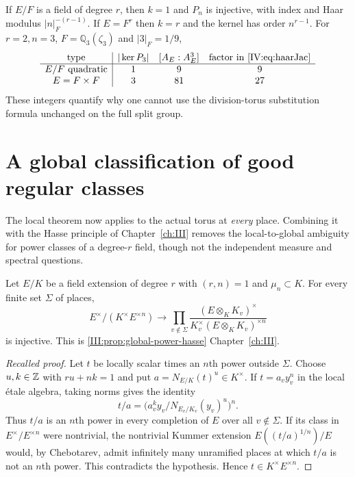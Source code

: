 \begin{example}
If $E/F$ is a field of degree $r$, then $k=1$ and $P_n$ is
injective, with index and Haar modulus $|n|_F^{-(r-1)}$.
If $E=F^r$ then $k=r$ and the kernel has order $n^{r-1}$.
For $r=2,n=3$, $F=\mathbb Q_3(\zeta_3)$ and $|3|_F=1/9$,
\[
\begin{array}{c|ccc}
\text{type}&|\ker P_3|&[A_E:A_E^3]&\text{factor in \eqref{IV:eq:haarJac}}\\\hline
E/F\text{ quadratic}&1&9&9\\
E=F\times F&3&81&27
\end{array}
\]
These integers quantify why one cannot use the division-torus
substitution formula unchanged on the full split group.
\end{example}

\section{A global classification of good regular classes}\label{IV:sec:globalgood}
The local theorem now applies to the actual torus at \emph{every}
place.  Combining it with the Hasse principle of Chapter~\ref{ch:III} removes
the local-to-global ambiguity for power classes of a degree-$r$
field, though not the independent measure and spectral questions.

\begin{proposition}\label{IV:prop:Hasse}
Let $E/K$ be a field extension of degree $r$ with $(r,n)=1$ and
$\mu_n\subset K$.  For every finite set $\Sigma$ of places,
\begin{equation}\label{IV:eq:Hasse}
 E^\times/(K^\times E^{\times n})\longrightarrow
 \prod_{v\notin\Sigma}
 \frac{(E\otimes_K K_v)^\times}
 {K_v^\times(E\otimes_KK_v)^{\times n}}
\end{equation}
is injective.  This is \cref{III:prop:global-power-hasse} Chapter~\ref{ch:III}.
\end{proposition}
\begin{proof}[Recalled proof]
Let $t$ be locally scalar times an $n$th power outside $\Sigma$.
Choose $u,k\in\mathbb Z$ with $ru+nk=1$ and put
$a=N_{E/K}(t)^u\in K^\times$.  If $t=a_v y_v^n$ in the local
\'etale algebra, taking norms gives the identity
\[
 t/a=\bigl(a_v^k y_v/N_{E_v/K_v}(y_v)^u\bigr)^n.
\]
Thus $t/a$ is an $n$th power in every completion of $E$ over all
$v\notin\Sigma$.  If its class in $E^\times/E^{\times n}$ were
nontrivial, the nontrivial Kummer extension
$E((t/a)^{1/n})/E$ would, by Chebotarev, admit infinitely many
unramified places at which $t/a$ is not an $n$th power.
This contradicts the hypothesis.  Hence $t\in K^\times E^{\times n}$.
\end{proof}

